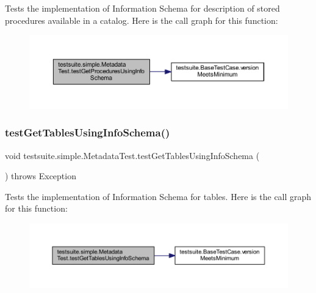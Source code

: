 Tests the implementation of Information Schema for description of stored procedures available in a catalog. Here is the call graph for this function\+:
\nopagebreak
\begin{figure}[H]
\begin{center}
\leavevmode
\includegraphics[width=350pt]{classtestsuite_1_1simple_1_1_metadata_test_a2b94ef57c9572c0d5351c4ca8201b677_cgraph}
\end{center}
\end{figure}
\mbox{\label{classtestsuite_1_1simple_1_1_metadata_test_a480ded9536c6ed0ec7ae1cc82bc75a9b}} 
\subsubsection{\texorpdfstring{test\+Get\+Tables\+Using\+Info\+Schema()}{testGetTablesUsingInfoSchema()}}
{\footnotesize\ttfamily void testsuite.\+simple.\+Metadata\+Test.\+test\+Get\+Tables\+Using\+Info\+Schema (\begin{DoxyParamCaption}{ }\end{DoxyParamCaption}) throws Exception}

Tests the implementation of Information Schema for tables. Here is the call graph for this function\+:
\nopagebreak
\begin{figure}[H]
\begin{center}
\leavevmode
\includegraphics[width=350pt]{classtestsuite_1_1simple_1_1_metadata_test_a480ded9536c6ed0ec7ae1cc82bc75a9b_cgraph}
\end{center}
\end{figure}
\mbox{\label{classtestsuite_1_1simple_1_1_metadata_test_a64f47fc5191272bd0bcf14cf6370480b}} 
